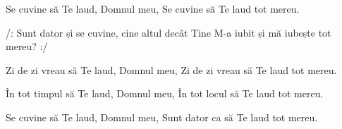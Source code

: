 \beginverse
Se cuvine să Te laud, Domnul meu,
Se cuvine să Te laud tot mereu.
\endverse

\beginchorus
/: Sunt dator și se cuvine, cine altul decât Tine
M-a iubit și mă iubește tot mereu? :/
\endchorus

\beginverse
Zi de zi vreau să Te laud, Domnul meu,
Zi de zi vreau să Te laud tot mereu.
\endverse

\beginverse
În tot timpul să Te laud, Domnul meu,
În tot locul să Te laud tot mereu.
\endverse

\beginverse
Se cuvine să Te laud, Domnul meu,
Sunt dator ca să Te laud tot mereu.
\endverse
\endsong